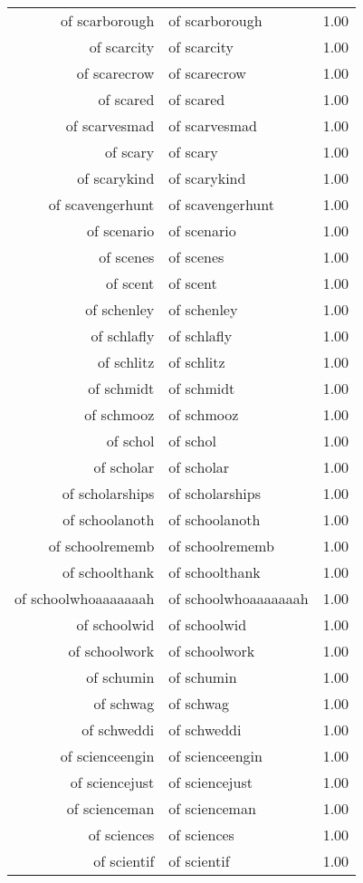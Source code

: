 \begin{table}[ht]
\begin{tabular}{rlr}
  of scarborough & of scarborough & 1.00 \\ 
  of scarcity & of scarcity & 1.00 \\ 
  of scarecrow & of scarecrow & 1.00 \\ 
  of scared & of scared & 1.00 \\ 
  of scarvesmad & of scarvesmad & 1.00 \\ 
  of scary & of scary & 1.00 \\ 
  of scarykind & of scarykind & 1.00 \\ 
  of scavengerhunt & of scavengerhunt & 1.00 \\ 
  of scenario & of scenario & 1.00 \\ 
  of scenes & of scenes & 1.00 \\ 
  of scent & of scent & 1.00 \\ 
  of schenley & of schenley & 1.00 \\ 
  of schlafly & of schlafly & 1.00 \\ 
  of schlitz & of schlitz & 1.00 \\ 
  of schmidt & of schmidt & 1.00 \\ 
  of schmooz & of schmooz & 1.00 \\ 
  of schol & of schol & 1.00 \\ 
  of scholar & of scholar & 1.00 \\ 
  of scholarships & of scholarships & 1.00 \\ 
  of schoolanoth & of schoolanoth & 1.00 \\ 
  of schoolrememb & of schoolrememb & 1.00 \\ 
  of schoolthank & of schoolthank & 1.00 \\ 
  of schoolwhoaaaaaaah & of schoolwhoaaaaaaah & 1.00 \\ 
  of schoolwid & of schoolwid & 1.00 \\ 
  of schoolwork & of schoolwork & 1.00 \\ 
  of schumin & of schumin & 1.00 \\ 
  of schwag & of schwag & 1.00 \\ 
  of schweddi & of schweddi & 1.00 \\ 
  of scienceengin & of scienceengin & 1.00 \\ 
  of sciencejust & of sciencejust & 1.00 \\ 
  of scienceman & of scienceman & 1.00 \\ 
  of sciences & of sciences & 1.00 \\ 
  of scientif & of scientif & 1.00 \\ 

\end{tabular}
\end{table}
